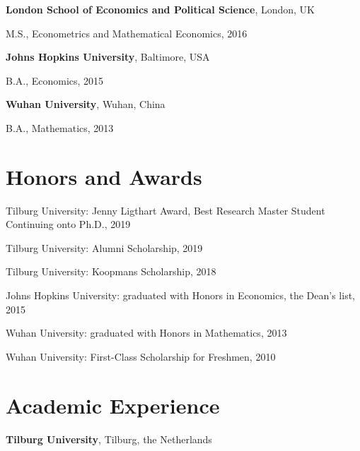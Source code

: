 \documentclass[margin,line]{res}
\newenvironment{list1}{
  \begin{list}{\ding{113}}{%
      \setlength{\itemsep}{0in}
      \setlength{\parsep}{0in} \setlength{\parskip}{0in}
      \setlength{\topsep}{0in} \setlength{\partopsep}{0in} 
      \setlength{\leftmargin}{0.17in}}}{\end{list}}
\begin{document}
\begin{resume}
{\bf London School of Economics and Political Science}, London, UK\\
\vspace*{-.1in}
\begin{list1}
\item[] M.S., Econometrics and Mathematical Economics, 2016
\end{list1}

{\bf Johns Hopkins University}, Baltimore, USA\\
\vspace*{-.1in}
\begin{list1}
\item[] B.A., Economics,  2015
\end{list1}

{\bf Wuhan University}, Wuhan, China\\
\vspace*{-.1in}
\begin{list1}
\item[] B.A., Mathematics,  2013
\end{list1}

\section{\sc Honors and Awards} 
Tilburg University: Jenny Ligthart Award, Best Research Master Student Continuing onto Ph.D., 2019

\vspace*{-2.5mm}
Tilburg University: Alumni Scholarship, 2019

\vspace*{-2.5mm}
Tilburg University: Koopmans Scholarship, 2018

\vspace*{-2.5mm}
Johns Hopkins University: graduated with Honors in Economics, the Dean's list, 2015

\vspace*{-2.5mm}
Wuhan University: graduated with Honors in Mathematics, 2013

\vspace*{-2.5mm}
Wuhan University: First-Class Scholarship for Freshmen, 2010

\section{\sc Academic Experience}
{\bf Tilburg University}, Tilburg, the Netherlands


\end{resume}
\end{document}
